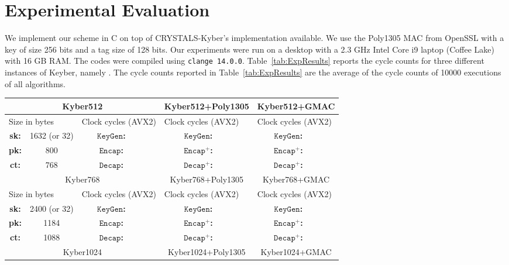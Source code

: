 \documentclass[floatrow,journal=tches,submission]{iacrtrans}
\newcommand{\keygen}{\texttt{KeyGen}}
\newcommand{\encap}{\texttt{Encap}}
\newcommand{\decap}{\texttt{Decap}}
\begin{document}
\section{Experimental Evaluation}
We implement our scheme in C on top of {\sf CRYSTALS-Kyber}'s implementation available. We use the Poly1305 MAC from {\sf OpenSSL} with a key of size 256 bits and a tag size of 128 bits. Our experiments were run on a desktop with a 2.3 GHz Intel Core i9 laptop (Coffee Lake) with 16 GB RAM. The codes were compiled using \texttt{clange 14.0.0}. 
Table~\ref{tab:ExpResults} reports the cycle counts for three different instances of Keyber, namely . The cycle counts reported in Table~\ref{tab:ExpResults} are the average of the cycle counts of 10000 executions of all algorithms. 
\begin{table}[h]
\centering
\begin{tabular}{|c|c||c|c| |c|c| |c|c|} \hline
\multicolumn{4}{|c|}{Kyber512}  & \multicolumn{2}{|c|}{Kyber512+Poly1305} & \multicolumn{2}{|c|}{Kyber512+GMAC} \\ \hline
\multicolumn{2}{|l|}{Size in bytes} & \multicolumn{2}{|l|}{Clock cycles (AVX2)} & \multicolumn{2}{|l|}{Clock cycles (AVX2)} & \multicolumn{2}{|l|}{Clock cycles (AVX2)} \\ \hline 
{\bf sk:} & 1632 (or 32) & {\bf $\keygen$:} &  & {\bf $\keygen$:} & & {\bf $\keygen$:} & \\ \hline 
{\bf pk:} & 800 & {\bf $\encap$:} & & {\bf $\encap^+$:} & & {\bf $\encap^+$:} & \\ \hline 
{\bf ct:} & 768 & {\bf $\decap$:} &  & {\bf $\decap^+$:} & & {\bf $\decap^+$:} & \\ \hline 
\hline 
\multicolumn{4}{|c|}{Kyber768}  & \multicolumn{2}{|c|}{Kyber768+Poly1305} & \multicolumn{2}{|c|}{Kyber768+GMAC} \\ \hline
\multicolumn{2}{|l|}{Size in bytes} & \multicolumn{2}{|l|}{Clock cycles (AVX2)} & \multicolumn{2}{|l|}{Clock cycles (AVX2)} & \multicolumn{2}{|l|}{Clock cycles (AVX2)} \\ \hline 
{\bf sk:} & 2400 (or 32) & {\bf $\keygen$:} & & {\bf $\keygen$:} & & {\bf $\keygen$:} & \\ \hline 
{\bf pk:} & 1184 & {\bf $\encap$:} & & {\bf $\encap^+$:} &  & {\bf $\encap^+$:} & \\ \hline 
{\bf ct:} & 1088 & {\bf $\decap$:} &  & {\bf $\decap^+$:} & & {\bf $\decap^+$:} & \\ \hline 
\hline 
\multicolumn{4}{|c|}{Kyber1024}  & \multicolumn{2}{|c|}{Kyber1024+Poly1305} & \multicolumn{2}{|c|}{Kyber1024+GMAC} \\ \hline

\end{tabular}
\end{table}
\end{document}
